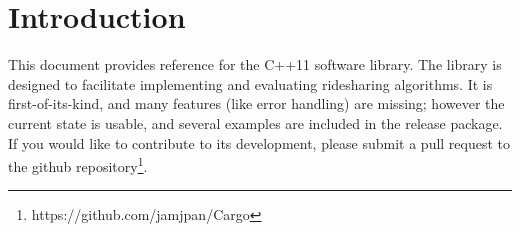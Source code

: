 \section{Introduction}

This document provides reference for the  C++11 software
library.  The library is designed to facilitate implementing and evaluating
ridesharing algorithms.  It is first-of-its-kind, and many features (like error
handling) are missing; however the current state is usable, and several
examples are included in the release package.  If you would like to contribute
to its development, please submit a pull request to the github
repository\footnote{https://github.com/jamjpan/Cargo}.


